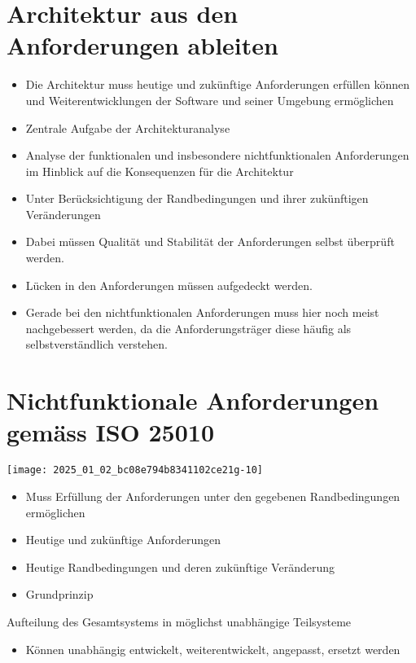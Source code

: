 \documentclass[10pt]{article}
\begin{document}
\section*{Architektur aus den Anforderungen ableiten}
\begin{itemize}
  \item Die Architektur muss heutige und zukünftige Anforderungen erfüllen können und Weiterentwicklungen der Software und seiner Umgebung ermöglichen
  \item Zentrale Aufgabe der Architekturanalyse
  \item Analyse der funktionalen und insbesondere nichtfunktionalen Anforderungen im Hinblick auf die Konsequenzen für die Architektur
  \item Unter Berücksichtigung der Randbedingungen und ihrer zukünftigen Veränderungen
  \item Dabei müssen Qualität und Stabilität der Anforderungen selbst überprüft werden.
  \item Lücken in den Anforderungen müssen aufgedeckt werden.
  \item Gerade bei den nichtfunktionalen Anforderungen muss hier noch meist nachgebessert werden, da die Anforderungsträger diese häufig als selbstverständlich verstehen.
\end{itemize}

\section*{Nichtfunktionale Anforderungen gemäss ISO 25010}
\begin{center}
\texttt{[image: 2025\_01\_02\_bc08e794b8341102ce21g-10]}
\end{center}

\begin{itemize}
  \item Muss Erfüllung der Anforderungen unter den gegebenen Randbedingungen ermöglichen
  \item Heutige und zukünftige Anforderungen
  \item Heutige Randbedingungen und deren zukünftige Veränderung
  \item Grundprinzip
\end{itemize}

Aufteilung des Gesamtsystems in möglichst unabhängige Teilsysteme

\begin{itemize}
  \item Können unabhängig entwickelt, weiterentwickelt, angepasst, ersetzt werden
\end{itemize}
\end{document}
